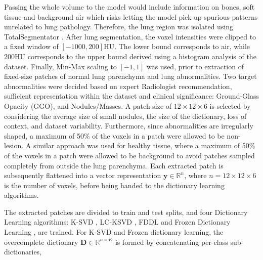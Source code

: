 \documentclass{article}
\begin{document}
Passing the whole volume to the model would include information on bones, soft tissue and background air which
risks letting the model pick up spurious patterns unrelated to lung pathology. Therefore, the lung region was isolated
using TotalSegmentator \cite{wasserthal2023totalsegmentator}. After lung segmentation, the voxel intensities were clipped to a fixed window of
$[-1000, 200] \text{HU}$. The lower bound corresponds to air, while $200 \text{HU}$ corresponds to the upper bound
derived using a histogram analysis of the dataset. Finally, Min-Max scaling to $[-1, 1]$ was used, prior to
extraction of fixed-size patches of normal lung parenchyma and lung abnormalities. Two target abnormalities were decided based
on expert Radiologist recommendation, sufficient representation within the dataset and clinical significance:
Ground-Glass Opacity (GGO), and Nodules/Masses. A patch size of $12 \times 12 \times 6$ is selected by considering
the average size of small nodules, the size of the dictionary, loss of context, and dataset variability. Furthermore, since
abnormalities are irregularly shaped, a maximum of 50\% of the voxels in a patch were allowed to be non-lesion.
A similar approach was used for healthy tissue, where a maximum of 50\% of the voxels in a patch were allowed to be
background to avoid patches sampled completely from outside the lung parenchyma. Each extracted patch is subsequently
flattened into a vector representation $\mathbf{y} \in \mathbb{R}^{n}$, where $n = 12 \times 12 \times 6$ is the number
of voxels, before being handed to the dictionary learning algorithms.



The extracted patches are divided to train and test splits, and four Dictionary Learning algorithms: K-SVD \cite{aharon2006ksvd},
LC-KSVD \cite{jiang2013lcksvd}, FDDL \cite{yang2011fddl} and Frozen Dictionary Learning \cite{carroll2017frozen}, are trained.
For K-SVD and Frozen dictionary learning, the overcomplete dictionary $\mathbf{D} \in \mathbb{R}^{n \times K}$ is
formed by concatenating per-class sub-dictionaries,
\end{document}
